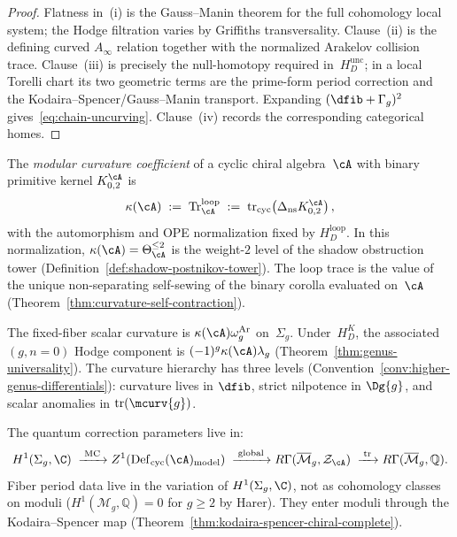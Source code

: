 \begin{proof}
Flatness in~\textup{(i)} is the Gauss--Manin theorem for the full
cohomology local system; the Hodge filtration varies by Griffiths
transversality.  Clause~\textup{(ii)} is the defining curved
$A_\infty$ relation together with the normalized Arakelov collision
trace.  Clause~\textup{(iii)} is precisely the null-homotopy required
in~$H_D^{\mathrm{unc}}$; in a local Torelli chart its two geometric
terms are the prime-form period correction and the
Kodaira--Spencer/Gauss--Manin transport.  Expanding
$(\dfib+\Gamma_g)^2$ gives~\eqref{eq:chain-uncurving}.
Clause~\textup{(iv)} records the corresponding categorical homes.
\end{proof}

\begin{definition}
\label{def:modular-curvature-direct}
\label{def:scalar-curvature-shadow}
The \emph{modular curvature coefficient} of a cyclic chiral
algebra~$\cA$ with binary primitive kernel $K_{0,2}^{\cA}$ is
\begin{equation}\label{eq:kappa-direct}
\kappa(\cA)
\;:=\;
\operatorname{Tr}^{\mathrm{loop}}_\cA
\;:=\;
\operatorname{tr}_{\mathrm{cyc}}\!\left(
\Delta_{\mathrm{ns}}K_{0,2}^{\cA}\right),
\end{equation}
with the automorphism and OPE normalization fixed by
$H_D^{\mathrm{loop}}$.  In this normalization,
$\kappa(\cA) = \Theta_{\cA}^{\leq 2}$ is the
weight-$2$ level of the shadow obstruction tower
\textup{(}Definition~\textup{\ref{def:shadow-postnikov-tower})}.
The loop trace is the value of the unique
non-separating self-sewing of the binary corolla evaluated
on~$\cA$
(Theorem~\ref{thm:curvature-self-contraction}).

The fixed-fiber scalar curvature is
$\kappa(\cA)\omega_g^{\mathrm{Ar}}$ on~$\Sigma_g$.
Under~$H_D^K$, the associated $(g,n{=}0)$ Hodge component is
$(-1)^g\kappa(\cA)\lambda_g$
(Theorem~\ref{thm:genus-universality}).
The curvature hierarchy has three levels
(Convention~\ref{conv:higher-genus-differentials}): curvature lives in
$\dfib$, strict nilpotence in $\Dg{g}$, and scalar anomalies in
$\mathrm{tr}(\mcurv{g})$.
\end{definition}

\begin{remark}\label{rem:parameter-source}
The quantum correction parameters live in:
\[
H^1(\Sigma_g, \C)
\;\xrightarrow{\;\text{MC}\;}
Z^1(\operatorname{Def}_{\mathrm{cyc}}(\cA)_{\mathrm{model}})
\;\xrightarrow{\;\text{global}\;}
R\Gamma(\overline{\mathcal{M}}_g, \mathcal{Z}_{\cA})
\;\xrightarrow{\;\mathrm{tr}\;}
R\Gamma(\overline{\mathcal{M}}_g, \mathbb{Q}).
\]
Fiber period data live in the variation of $H^1(\Sigma_g,\C)$, not
as cohomology classes on moduli
($H^1(\mathcal{M}_g,\mathbb{Q})=0$ for $g\geq 2$ by Harer).
They enter moduli through the Kodaira--Spencer map
(Theorem~\ref{thm:kodaira-spencer-chiral-complete}).
\end{remark}

